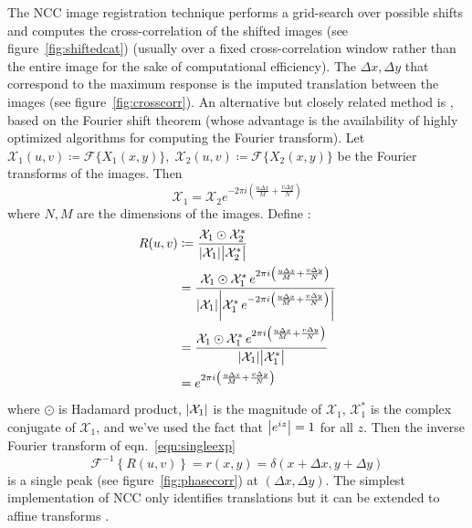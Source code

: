 
%
The NCC image registration technique performs a grid-search over possible shifts and computes the cross-correlation of the shifted images (see figure~\ref{fig:shiftedcat}) (usually over a fixed cross-correlation window rather than the entire image for the sake of computational efficiency).
%
The \(\Delta x, \Delta y\) that correspond to the maximum response is the imputed translation between the images (see figure~\ref{fig:crosscorr}).
%
An alternative but closely related method is , based on the Fourier shift theorem  (whose advantage is the availability of highly optimized algorithms for computing the Fourier transform).
%
Let \(\mathcal{X}_1(u,v) \coloneqq \mathcal{F}\{X_1(x,y)\}, \; \mathcal{X}_2(u,v) \coloneqq \mathcal{F}\{X_2(x,y)\}\) be the Fourier transforms of the images.
%
Then
\[
	\mathcal{X}_1 = \mathcal{X}_2  e^{-2 \pi i \left(\frac{u \Delta x}{M} + \frac{v \Delta y}{N}\right)}
\]
where \(N,M\) are the dimensions of the images.
%
Define :
\begin{align}
	R(u,v) & \coloneqq \frac{\mathcal{X}_1\odot \mathcal{X}_2^{*}}{\abs{\mathcal{X}_1 }\abs{\mathcal{X}_2^{*} }}                                                                                                                                          \\
	       & = \frac{\mathcal{X}_1\odot \mathcal{X}_1^{*} \, e^{2 \pi i \left(\frac{u \Delta x}{M} + \frac{v \Delta y}{N}\right)}}{\abs{\mathcal{X}_1 }\abs{\mathcal{X}_1^{*} \, e^{-2 \pi i \left(\frac{u \Delta x}{M} + \frac{v \Delta y}{N}\right)} }} \\
	       & = \frac{\mathcal{X}_1\odot \mathcal{X}_1^{*} \, e^{2 \pi i \left(\frac{u \Delta x}{M} + \frac{v \Delta y}{N}\right)}}{\abs{\mathcal{X}_1 }\abs{\mathcal{X}_1^{*} }}                                                                          \\
	       & = e^{2 \pi i \left(\frac{u \Delta x}{M} + \frac{v \Delta y}{N}\right)} \label{eqn:singleexp}
\end{align}
where \(\odot\) is Hadamard product, \(\abs{\mathcal{X}_1}\) is the magnitude of \(\mathcal{X}_1\), \(\mathcal{X}_1^*\) is the complex conjugate of \(\mathcal{X}_1\), and we've used the fact that \(\abs{e^{iz}}=1\) for all \(z\).
%
Then the inverse Fourier transform of eqn.~\eqref{eqn:singleexp}
\[
	\mathcal{F}^{-1}\left\{ R(u,v) \right\} = r(x,y) = \delta(x + \Delta x, y + \Delta y)
\]
is a single peak (see figure~\ref{fig:phasecorr}) at \((\Delta x, \Delta y)\).
%
The simplest implementation of NCC only identifies translations but it can be extended to affine transforms \cite{berthilsson1998}.

